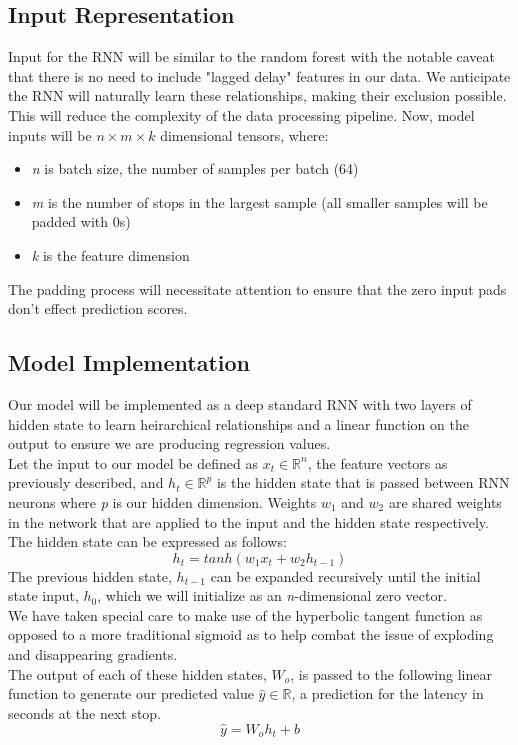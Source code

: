 \documentclass[sigconf]{acmart}
\begin{document}
\subsection{Input Representation}
Input for the RNN will be similar to the random forest with the notable caveat that there is no need to include "lagged delay"
features in our data. We anticipate the RNN will naturally learn these relationships, making their exclusion possible. This will reduce the complexity of the data processing pipeline. Now, model inputs will be $\textit{n} \times \textit{m} \times k$ dimensional tensors, where:
\begin{itemize}
    \item \textit{n} is batch size, the number of samples per batch (64)
    \item \textit{m} is the number of stops in the largest sample (all smaller samples will be padded with 0s)
    \item \textit{k} is the feature dimension
\end{itemize}
The padding process will necessitate attention to ensure that the zero input pads don't effect prediction scores.

\subsection{Model Implementation}
Our model will be implemented as a deep standard RNN with two layers of hidden state to learn heirarchical relationships and a linear function on the output to ensure we are producing regression values.\\
Let the input to our model be defined as $x_t \in \mathbb{R}^n$, the feature vectors as previously described, and $h_t \in \mathbb{R}^p$ is the hidden state that is passed between RNN neurons where \textit{p} is our hidden dimension. Weights $w_1$ and $w_2$ are shared weights in the network that are applied to the input and the hidden state respectively. The hidden state can be expressed as follows:
$$h_t = tanh(w_1x_t + w_2h_{t-1})$$
The previous hidden state, $h_{t-1}$ can be expanded recursively until the initial state input, $h_0$, which we will initialize as an \textit{n}-dimensional zero vector.\\
We have taken special care to make use of the hyperbolic tangent function as opposed to a more traditional sigmoid as to help combat the issue of exploding and disappearing gradients.\\
The output of each of these hidden states, $W_o$, is passed to the following linear function to generate our predicted value $\hat{y} \in \mathbb{R}$, a prediction for the latency in seconds at the next stop.
$$\hat{y} = W_oh_t + b$$
\end{document}
